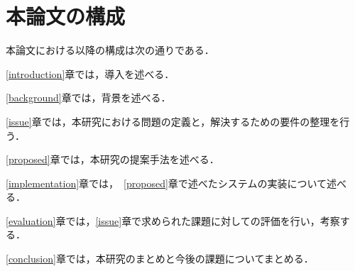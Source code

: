 \section{本論文の構成}

本論文における以降の構成は次の通りである．

\ref{introduction}章では，導入を述べる．

\ref{background}章では，背景を述べる．

\ref{issue}章では，本研究における問題の定義と，解決するための要件の整理を行う．

\ref{proposed}章では，本研究の提案手法を述べる．

\ref{implementation}章では，~\ref{proposed}章で述べたシステムの実装について述べる．

\ref{evaluation}章では，\ref{issue}章で求められた課題に対しての評価を行い，考察する．

\ref{conclusion}章では，本研究のまとめと今後の課題についてまとめる．